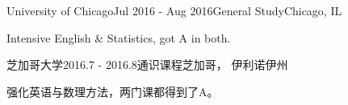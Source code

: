 \ifx\lang\eng
	\begin{rSubsection}{University of Chicago}{Jul 2016 - Aug 2016}{General Study}{Chicago, IL}
		\item Intensive English \& Statistics, got A in both.
	\end{rSubsection}
\else
	\begin{rSubsection}{芝加哥大学}{2016.7 - 2016.8}{通识课程}{芝加哥， 伊利诺伊州}
		\item 强化英语与数理方法，两门课都得到了A。
	\end{rSubsection}
\fi